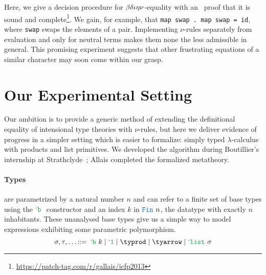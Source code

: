 Here, we give a decision procedure for
$\operatorname{\beta\delta\iota\eta\nu}$-equality with an \agda\ proof that it is
sound and complete\footnote{\url{https://patch-tag.com/r/gallais/icfp2013}}.
We gain, for example, that \texttt{map swap . map swap = id}, where \texttt{swap}
swaps the elements of a pair. Implementing $\nu$-rules separately from evaluation
and only for neutral terms makes them none the less admissible in general. This
promising experiment suggests that other frustrating equations of a similar
character may soon come within our grasp.


\section{Our Experimental Setting}

Our ambition is to provide a generic method of extending the
definitional equality of intensional type theories with $\nu$-rules,
but here we deliver evidence of progress in a simpler setting which is
easier to formalize: simply typed $\lambda$-calculus with products and
list primitives. We developed the algorithm during Boutillier's internship at
Strathclyde~\cite{LambList}; Allais completed the formalized metatheory.

\paragraph{Types} are parametrized by a natural number $n$ and can refer to a
finite set of base types using the $\tybase[]$ constructor and an index $k$ in
$\fin$, the datatype with exactly $n$ inhabitants. These
unanalysed base types give us a simple way to model expressions
exhibiting some parametric polymorphism.
$$\sigma, \tau, \dots \gramdecl
           \tybase
  \mid \tyunit
  \mid \typrod
  \mid \tyarrow
  \mid \tylist$$

